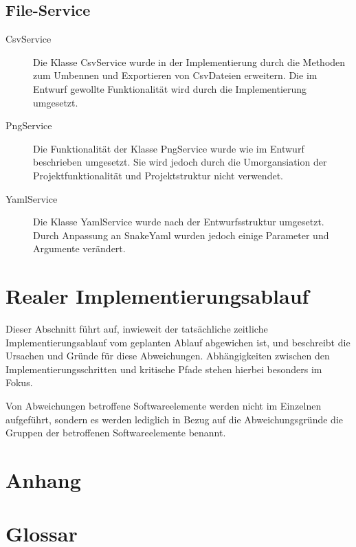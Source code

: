 \documentclass[parskip=full]{scrartcl}
\begin{document}
\subsection{File-Service}

\begin{description}
\item[CsvService] Die Klasse CsvService wurde in der Implementierung durch die Methoden zum Umbennen und Exportieren von CsvDateien erweitern. Die im Entwurf gewollte Funktionalität wird durch die Implementierung umgesetzt.
\item[PngService] Die Funktionalität der Klasse PngService wurde wie im Entwurf beschrieben umgesetzt. Sie wird jedoch durch die Umorgansiation der Projektfunktionalität und Projektstruktur nicht verwendet.
\item[YamlService] Die Klasse YamlService wurde nach der Entwurfsstruktur umgesetzt. Durch Anpassung an SnakeYaml wurden jedoch einige Parameter und Argumente verändert.

\end{description}

\section{Realer Implementierungsablauf}

Dieser Abschnitt führt auf, inwieweit der tatsächliche zeitliche Implementierungsablauf vom geplanten Ablauf abgewichen ist, und beschreibt die Ursachen und Gründe für diese Abweichungen. Abhängigkeiten zwischen den Implementierungsschritten und kritische Pfade stehen hierbei besonders im Fokus.

Von Abweichungen betroffene Softwareelemente werden nicht im Einzelnen aufgeführt, sondern es werden lediglich in Bezug auf die Abweichungsgründe die Gruppen der betroffenen Softwareelemente benannt.

\section{Anhang}



\clearpage
\section{Glossar}\label{glossar}

\renewcommand*{\glossarysection}[2][]{}	%
\printnoidxglossaries				%
\end{document}
